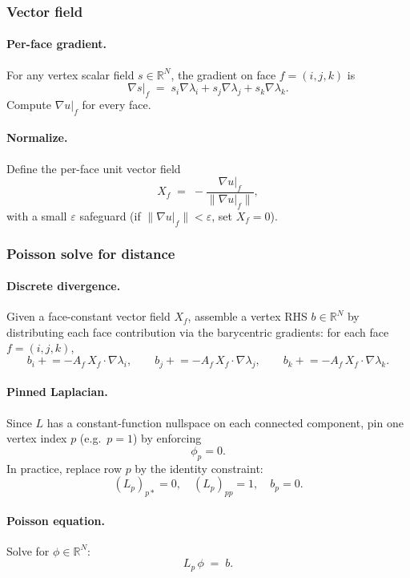 \documentclass[12pt,a4paper]{article}
\theoremstyle{plain}
\theoremstyle{definition}
\begin{document}
	\subsubsection*{Vector field}
	
	\paragraph{Per-face gradient.}
	For any vertex scalar field \(s\in\mathbb{R}^N\), the gradient on face
	\(f=(i,j,k)\) is
	\[
	\nabla s\big|_f \;=\; s_i\nabla\lambda_i + s_j\nabla\lambda_j + s_k\nabla\lambda_k.
	\]
	Compute \(\nabla u|_f\) for every face.
	
	\paragraph{Normalize.}
	Define the per-face unit vector field
	\[
	X_f \;=\; -\frac{\nabla u|_f}{\|\nabla u|_f\|},
	\]
	with a small \(\varepsilon\) safeguard (if \(\|\nabla u|_f\|<\varepsilon\), set \(X_f=0\)).
	
	\subsubsection*{Poisson solve for distance}
	
	\paragraph{Discrete divergence.}
	Given a face-constant vector field \(X_f\), assemble a vertex RHS \(b\in\mathbb{R}^N\) by
	distributing each face contribution via the barycentric gradients:
	for each face \(f=(i,j,k)\),
	\[
	b_i \mathrel{+}= -A_f\, X_f\cdot\nabla\lambda_i,\qquad
	b_j \mathrel{+}= -A_f\, X_f\cdot\nabla\lambda_j,\qquad
	b_k \mathrel{+}= -A_f\, X_f\cdot\nabla\lambda_k.
	\]
	
	\paragraph{Pinned Laplacian.}
	Since \(L\) has a constant-function nullspace on each connected component,
	pin one vertex index \(p\) (e.g.\ \(p=1\)) by enforcing
	\[
	\phi_p = 0.
	\]
	In practice, replace row \(p\) by the identity constraint:
	\[
	(L_p)_{p\ast}=0,\quad (L_p)_{pp}=1,\quad b_p=0.
	\]
	
	\paragraph{Poisson equation.}
	Solve for \(\phi\in\mathbb{R}^N\):
	\[
	L_p\,\phi \;=\; b.
	\]
	
\end{document}
